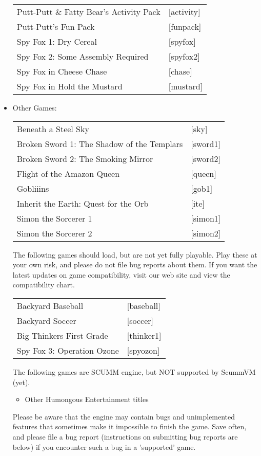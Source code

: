 \begin{itemize}
\begin{tabular}[h]{ll}
    Putt-Putt \& Fatty Bear's Activity Pack&                       [activity]\\
    Putt-Putt's Fun Pack&                                          [funpack]\\
    Spy Fox 1: Dry Cereal&                                         [spyfox]\\
    Spy Fox 2: Some Assembly Required&                             [spyfox2]\\
    Spy Fox in Cheese Chase&                                       [chase]\\
    Spy Fox in Hold the Mustard&                                   [mustard]\\
  \end{tabular}
\item Other Games:\\ 
  \begin{tabular}[h]{ll}
    Beneath a Steel Sky&                           [sky]\\
    Broken Sword 1: The Shadow of the Templars&    [sword1]\\
    Broken Sword 2: The Smoking Mirror&            [sword2]\\
    Flight of the Amazon Queen&                    [queen]\\
    Gobliiins&                                     [gob1]\\
    Inherit the Earth: Quest for the Orb&          [ite]\\
    Simon the Sorcerer 1&                          [simon1]\\
    Simon the Sorcerer 2&                          [simon2]\\
  \end{tabular}

  The following games should load, but are not yet fully playable. Play these at your own risk, and please do not file bug reports about them. If you want
the latest updates on game compatibility, visit our web site and view the
compatibility chart.

\begin{tabular}{ll}
  Backyard Baseball&                               [baseball]\\
  Backyard Soccer&                                 [soccer]\\
  Big Thinkers First Grade&                        [thinker1]\\
  Spy Fox 3: Operation Ozone&                      [spyozon]\\
\end{tabular}

  The following games are SCUMM engine, but NOT supported by ScummVM (yet).
  \begin{itemize}
  \item Other Humongous Entertainment titles
  \end{itemize}
%
Please be aware that the engine may contain bugs and unimplemented features
that sometimes make it impossible to finish the game. Save often, and please
file a bug report (instructions on submitting bug reports are below) if you
encounter such a bug in a 'supported' game.
\end{itemize}
